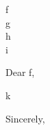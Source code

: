 \documentclass[11pt]{letter}
\newcommand{\recipient}{f}
\newcommand{\company}{g}
\newcommand{\companyaddress}{h}
\newcommand{\companycity}{i}
\newcommand{\letterdate}{October 16, 2025}
\begin{document}
\begin{letter}{\recipient \\ \company \\ \companyaddress \\ \companycity}
\date{\letterdate}

\opening{Dear \recipient,}

k

\closing{Sincerely,}

\end{letter}
\end{document}
